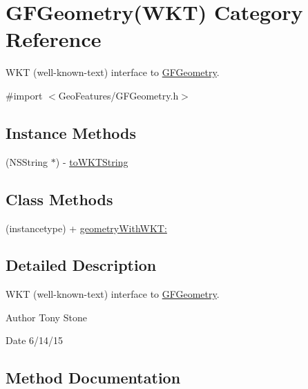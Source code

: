 \hypertarget{category_g_f_geometry_07_w_k_t_08}{}\section{G\+F\+Geometry(W\+K\+T) Category Reference}
\label{category_g_f_geometry_07_w_k_t_08}


W\+K\+T (well-\/known-\/text) interface to \hyperlink{interface_g_f_geometry}{G\+F\+Geometry}.  




{\ttfamily \#import $<$Geo\+Features/\+G\+F\+Geometry.\+h$>$}

\subsection*{Instance Methods}
\begin{DoxyCompactItemize}
\item 
(N\+S\+String $\ast$) -\/ \hyperlink{category_g_f_geometry_07_w_k_t_08_a9d257cce05d031211e2cece24b5530e4}{to\+W\+K\+T\+String}
\end{DoxyCompactItemize}
\subsection*{Class Methods}
\begin{DoxyCompactItemize}
\item 
(instancetype) + \hyperlink{category_g_f_geometry_07_w_k_t_08_a32a49e08fdbc2998735c26ddbfa88741}{geometry\+With\+W\+K\+T\+:}
\end{DoxyCompactItemize}


\subsection{Detailed Description}
W\+K\+T (well-\/known-\/text) interface to \hyperlink{interface_g_f_geometry}{G\+F\+Geometry}. 

\begin{DoxyAuthor}{Author}
Tony Stone 
\end{DoxyAuthor}
\begin{DoxyDate}{Date}
6/14/15 
\end{DoxyDate}


\subsection{Method Documentation}
\hypertarget{category_g_f_geometry_07_w_k_t_08_a32a49e08fdbc2998735c26ddbfa88741}{}
